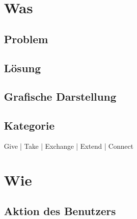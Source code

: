 

\maketitle

\section*{Was}

\subsection*{Problem}
\desc

\subsection*{Lösung}
\solution

\subsection*{Grafische Darstellung}
\begin{figure}[H]
\end{figure}

\subsection*{Kategorie}
 Give   |   
 Take   |   
 Exchange   |   
 Extend   |   
 Connect


\section*{Wie}

\subsection*{Aktion des Benutzers}
\useraction

